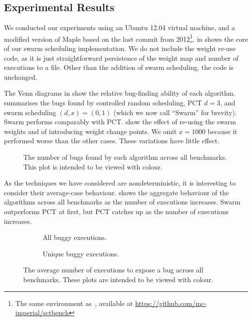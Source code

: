 \subsection{Experimental Results}
\label{sec:algorithms-bench-results}

We conducted our experiments using an Ubuntu 12.04 virtual machine,
and a modified version of Maple based on the last commit from
2012\footnote{The same environment as~\cite{thomson2016}, available at
  \url{https://github.com/mc-imperial/sctbench}}.   in
 shows the core of our swarm scheduling
implementation.  We do not include the weight re-use code, as it is
just straightforward persistence of the weight map and number of
executions to a file.  Other than the addition of swarm scheduling,
the code is unchanged.

The Venn diagrams in  show the relative bug-finding ability of
each algorithm.   summarises the bugs found by controlled
random scheduling, PCT $d=3$, and swarm scheduling $(d,x)=(0,1)$ (which we now
call ``Swarm'' for brevity).  Swarm performs comparably
with PCT.   show the effect of re-using
the swarm weights and of introducing weight change points.  We omit $x=1000$
because it performed worse than the other cases.  These variations
have little effect.

\begin{figure}
  \centering
  
  \caption[Plot of bugs found by each scheduling algorithm.]{The number of bugs found by each algorithm across all benchmarks.  This plot is intended to be viewed with colour.}\label{fig:totalbugs}
\end{figure}

As the techniques we have considered are nondeterministic, it is
interesting to consider their average-case behaviour.
 shows the aggregate behaviour of the algorithms
across all benchmarks as the number of executions increases.  Swarm
outperforms PCT at first, but PCT catches up as the number of
executions increases.

\begin{figure}
  \centering
  \begin{subfigure}{0.49\textwidth}
    \centering
    \resizebox{\textwidth}{!}{}
    \caption{All buggy executions.}\label{fig:freqbugs-total}
  \end{subfigure}
  \begin{subfigure}{0.49\textwidth}
    \centering
    \resizebox{\textwidth}{!}{}
    \caption{Unique buggy executions.}\label{fig:freqbugs-unique}
  \end{subfigure}
  \caption[Plot of average number of executions needed to expose a bug.]{The average number of executions to expose a bug across all benchmarks.  These plots are intended to be viewed with colour.}\label{fig:freqbugs}
\end{figure}

